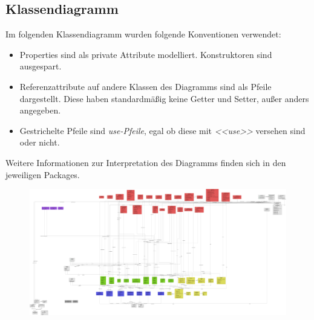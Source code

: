 
\newcommand{\classtable}[1]{\begin{longtable}[H]{m{5cm}m{9cm}}
                                \hline
                                \textbf{Klassenname} & \textbf{Beschreibung} \\
                                \hline
                                \hline
                                #1
\end{longtable}
}

\newcommand{\classentry}[2]{\textbf{#1} & #2 \\
	\hline
}

\subsection{Klassendiagramm}

Im folgenden Klassendiagramm wurden folgende Konventionen verwendet:
\begin{itemize}
    \item Properties sind als private Attribute modelliert.
    Konstruktoren sind ausgespart.
    \item Referenzattribute auf andere Klassen des Diagramms sind als Pfeile dargestellt.
    Diese haben standardmäßig keine Getter und Setter, außer anders angegeben.
    \item Gestrichelte Pfeile sind \emph{use-Pfeile}, egal ob diese mit \emph{<<use>>} versehen sind oder nicht.
\end{itemize}

Weitere Informationen zur Interpretation des Diagramms finden sich in den jeweiligen Packages.

\begin{figure}[H]
	\centering
	\includegraphics[width=\linewidth]{graphics/klassendiagramm_png}
\end{figure}

